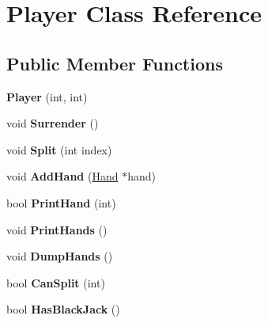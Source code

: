 \hypertarget{class_player}{}\section{Player Class Reference}
\label{class_player}
\subsection*{Public Member Functions}
\begin{DoxyCompactItemize}
\item 
{\bfseries Player} (int, int)\hypertarget{class_player_a6f57cdacb88f4c3c800c1fbf591ed28d}{}\label{class_player_a6f57cdacb88f4c3c800c1fbf591ed28d}

\item 
void {\bfseries Surrender} ()\hypertarget{class_player_af8c9588488fcfdbd0735506300576722}{}\label{class_player_af8c9588488fcfdbd0735506300576722}

\item 
void {\bfseries Split} (int index)\hypertarget{class_player_a3a627672714563333c44d83faf8a2696}{}\label{class_player_a3a627672714563333c44d83faf8a2696}

\item 
void {\bfseries Add\+Hand} (\hyperlink{class_hand}{Hand} $\ast$hand)\hypertarget{class_player_add15dd07cc4772d4509a49e31b04556b}{}\label{class_player_add15dd07cc4772d4509a49e31b04556b}

\item 
bool {\bfseries Print\+Hand} (int)\hypertarget{class_player_a2142881dd58bd5ac7a7ec75b958069e1}{}\label{class_player_a2142881dd58bd5ac7a7ec75b958069e1}

\item 
void {\bfseries Print\+Hands} ()\hypertarget{class_player_a31326f0143919f9d2412bf094f571a95}{}\label{class_player_a31326f0143919f9d2412bf094f571a95}

\item 
void {\bfseries Dump\+Hands} ()\hypertarget{class_player_a2b8128800c27146c8ecebbbf2d1f4ffa}{}\label{class_player_a2b8128800c27146c8ecebbbf2d1f4ffa}

\item 
bool {\bfseries Can\+Split} (int)\hypertarget{class_player_a228554349109ae4e44ee40209796bb16}{}\label{class_player_a228554349109ae4e44ee40209796bb16}

\item 
bool {\bfseries Has\+Black\+Jack} ()\hypertarget{class_player_ae7d44ce9ba3598f2e42ff3b8dbfa78a2}{}\label{class_player_ae7d44ce9ba3598f2e42ff3b8dbfa78a2}


\end{DoxyCompactItemize}
